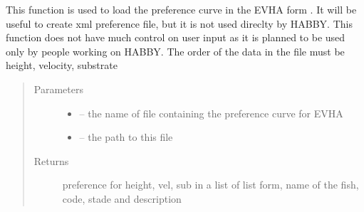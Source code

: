\documentclass[letterpaper,10pt,english]{sphinxmanual}
\begin{document}
\begin{fulllineitems}
\label{\detokenize{index:src.bio_info.load_evha_curve}}
This function is used to load the preference curve in the EVHA form . It will be useful to create xml preference
file, but it is not used direclty by HABBY. This function does not have much control on user input as it is planned
to be used only by people working on HABBY. The order of the data in the file must be height, velocity, substrate
\begin{quote}\begin{description}
\item[{Parameters}] \leavevmode\begin{itemize}
\item {} 
 -- the name of file containing the preference curve for EVHA

\item {} 
 -- the path to this file

\end{itemize}

\item[{Returns}] \leavevmode
preference for height, vel, sub in a list of list form, name of the fish, code, stade and description

\end{description}\end{quote}

\end{fulllineitems}

\end{document}
